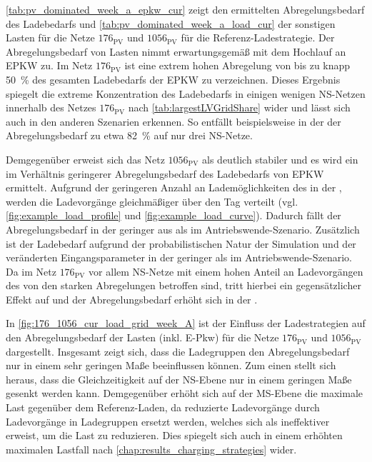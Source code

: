 



\autoref{tab:pv_dominated_week_a_epkw_cur} zeigt den ermittelten Abregelungsbedarf des Ladebedarfs und \autoref{tab:pv_dominated_week_a_load_cur} der sonstigen Lasten für die Netze \(176_{\text{PV}}\) und \(1056_{\text{PV}}\) für die Referenz-Ladestrategie.
Der Abregelungsbedarf von Lasten nimmt erwartungsgemäß mit dem Hochlauf an \gls{EPKW} zu.
Im Netz \(176_{\text{PV}}\) ist eine extrem hohen Abregelung von bis zu knapp \SI{50}{\percent} des gesamten Ladebedarfs der \gls{EPKW} zu verzeichnen.
Dieses Ergebnis spiegelt die extreme Konzentration des Ladebedarfs in einigen wenigen \gls{NS}-Netzen innerhalb des Netzes \(176_{\text{PV}}\) nach \autoref{tab:largestLVGridShare} wider und lässt sich auch in den anderen Szenarien erkennen.
So entfällt beispielsweise in der \SzeFirmenparkplatz der Abregelungsbedarf zu etwa \SI{82}{\percent} auf nur drei \gls{NS}-Netze.\medskip

Demgegenüber erweist sich das Netz \(1056_{\text{PV}}\) als deutlich stabiler und es wird ein im Verhältnis geringerer Abregelungsbedarf des Ladebedarfs von \gls{EPKW} ermittelt.
Aufgrund der geringeren Anzahl an Lademöglichkeiten des \UC \Firmeparkplatz in der \SzeFirmenparkplatzdot, werden die Ladevorgänge gleichmäßiger über den Tag verteilt (vgl. \autoref{fig:example_load_profile} und \autoref{fig:example_load_curve}).
Dadurch fällt der Abregelungsbedarf in der \SzeFirmenparkplatz geringer aus als im Antriebswende-Szenario.
Zusätzlich ist der Ladebedarf aufgrund der probabilistischen Natur der Simulation und der veränderten Eingangsparameter in der \SzeFirmenparkplatz geringer als im Antriebswende-Szenario.
Da im Netz \(176_{\text{PV}}\) vor allem \gls{NS}-Netze mit einem hohen Anteil an Ladevorgängen des \UC \zH von den starken Abregelungen betroffen sind, tritt hierbei ein gegensätzlicher Effekt auf und der Abregelungsbedarf erhöht sich in der \SzeFirmenparkplatzdot.





In \autoref{fig:176_1056_cur_load_grid_week_A} ist der Einfluss der Ladestrategien auf den Abregelungsbedarf der Lasten (inkl. E-Pkw) für die Netze \(176_{\text{PV}}\) und \(1056_{\text{PV}}\) dargestellt.
Insgesamt zeigt sich, dass die Ladegruppen den Abregelungsbedarf nur in einem sehr geringen Maße beeinflussen können.
Zum einen stellt sich heraus, dass die Gleichzeitigkeit auf der \gls{NS}-Ebene nur in einem geringen Maße gesenkt werden kann.
Demgegenüber erhöht sich auf der \gls{MS}-Ebene die maximale Last gegenüber dem Referenz-Laden, da reduzierte Ladevorgänge durch Ladevorgänge in Ladegruppen ersetzt werden, welches sich als ineffektiver erweist, um die Last zu reduzieren.
Dies spiegelt sich auch in einem erhöhten maximalen Lastfall nach \autoref{chap:results_charging_strategies} wider.

